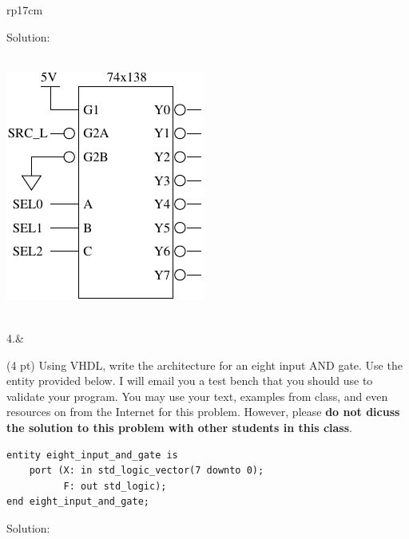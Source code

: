 \documentclass{article}
\begin{document}
\begin{longtable}[l]{rp{17cm}}
\begin{minipage}[t]{\linewidth}
Solution: \\ \\
\begin{center}
  \includegraphics{../Muxes/Assessments/74x138DMuxSchematic}
\end{center}
\end{minipage}\\
\medskip
4.&\begin{minipage}[t]{\linewidth}(4 pt) Using VHDL, write the architecture for an eight input AND gate.  Use the entity provided below.  I will email you a test bench that you should use to validate your program.  You may use your text, examples from class, and even resources on from the Internet for this problem.  However, please \textbf{do not dicuss the solution to this problem with other students in this class}.\\
\lstset{language=VHDL}
\begin{lstlisting}
entity eight_input_and_gate is
    port (X: in std_logic_vector(7 downto 0);
          F: out std_logic);
end eight_input_and_gate;
\end{lstlisting}

Solution: \\ \\

\end{minipage}\\
\medskip
\end{longtable}
\end{document}
